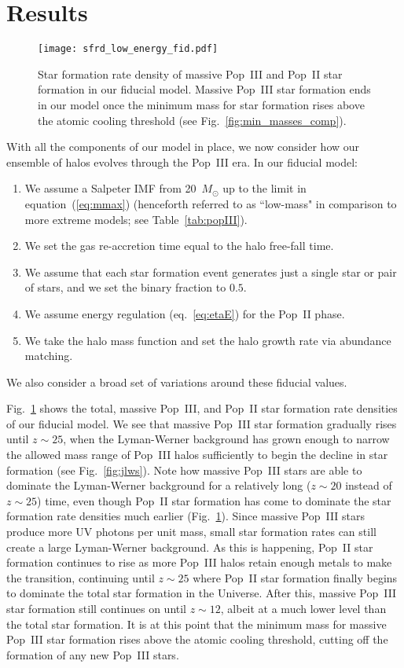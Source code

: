 \documentclass[a4paper,fleqn,usenatbib]{mnras}
\begin{document}
\section{Results}
\label{sec:results}

\begin{figure}
	\texttt{[image: sfrd\_low\_energy\_fid.pdf]}
    \caption{Star formation rate density of 
    massive Pop~III and Pop~II star formation in our fiducial model. Massive Pop~III star formation ends in our model once the minimum mass for star formation rises above the atomic cooling threshold (see Fig.~\ref{fig:min_masses_comp}).}
    \label{fig:sfrd_MT_fid_NLW}
\end{figure}

With all the components of our model in place, we now consider how our ensemble of halos evolves through the Pop~III era. 
In our fiducial model:
\begin{enumerate}
\item We assume a Salpeter IMF from 20~$M_\odot$ up to the limit in equation~(\ref{eq:mmax}) (henceforth referred to as ``low-mass" in comparison to more extreme models; see Table~\ref{tab:popIII}).
\item We set the gas re-accretion time equal to the halo free-fall time.
\item We assume that each star formation event generates just a single star or pair of stars, and we set the binary fraction to $0.5$.
\item We assume energy regulation (eq.~\ref{eq:etaE}) for the Pop~II phase.
\item We take the \citet{trac_2015} halo mass function and set the halo growth rate via abundance matching.
\end{enumerate}
We also consider a broad set of variations around these fiducial values. 

Fig.~\ref{fig:sfrd_MT_fid_NLW} shows the total, 
massive Pop~III, and Pop~II star formation rate densities of our fiducial model. We see that 
massive Pop~III star formation 
gradually rises until $z \sim 25$, when the Lyman-Werner background has grown enough to narrow the allowed mass range of Pop~III halos sufficiently to begin the decline in star formation (see Fig.~\ref{fig:jlws}).  Note how 
massive Pop~III stars are able to dominate the Lyman-Werner background for a relatively long 
($z \sim 20$ instead of $z \sim 25$) time, even though Pop~II star formation has 
come to dominate the star formation rate densities much earlier (Fig.~\ref{fig:sfrd_MT_fid_NLW}). Since 
massive Pop~III stars
produce more UV photons per unit mass, small star formation rates can still create a large Lyman-Werner background. As this is happening, Pop~II star formation continues to rise as more Pop~III halos retain enough metals to make the transition, continuing until $z \sim 25$ where Pop~II star formation finally begins to dominate the total star formation in the Universe. After this, massive Pop~III star formation still continues on until $z \sim 12$, albeit at a much lower level than the total star formation. It is at this point that the minimum mass for massive Pop~III star formation rises above the atomic cooling threshold, cutting off the formation of any new Pop~III stars.
\end{document}
